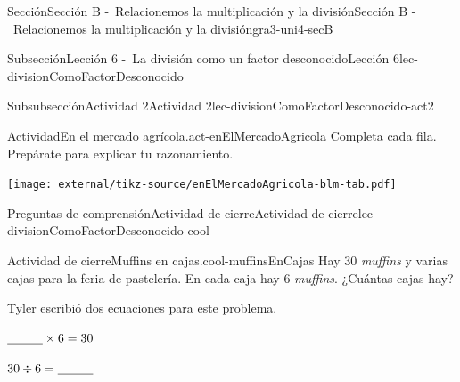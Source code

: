 \begin{sectionptx}{Sección}{Sección B -~Relacionemos la multiplicación y la división}{}{Sección B -~Relacionemos la multiplicación y la división}{}{}{gra3-uni4-secB}
%
%
\typeout{************************************************}
\typeout{************************************************}
%
\begin{subsectionptx}{Subsección}{Lección 6 -~La división como un factor desconocido}{}{Lección 6}{}{}{lec-divisionComoFactorDesconocido}
%
%
\typeout{************************************************}
\typeout{************************************************}
%
\begin{subsubsectionptx}{Subsubsección}{Actividad 2}{}{Actividad 2}{}{}{lec-divisionComoFactorDesconocido-act2}
\begin{activity}{Actividad}{En el mercado agrícola.}{act-enElMercadoAgricola}%
Completa cada fila. Prepárate para explicar tu razonamiento.%
\begin{image}{0}{1}{0}{}%
\texttt{[image: external/tikz-source/enElMercadoAgricola-blm-tab.pdf]}
\end{image}%
\end{activity}%
\end{subsubsectionptx}
%
%
\typeout{************************************************}
\typeout{************************************************}
%
\begin{reading-questions-subsubsection}{Preguntas de comprensión}{Actividad de cierre}{}{Actividad de cierre}{}{}{lec-divisionComoFactorDesconocido-cool}
\begin{project}{Actividad de cierre}{Muffins en cajas.}{cool-muffinsEnCajas}%
Hay 30 \emph{muffins} y varias cajas para la feria de pastelería. En cada caja hay 6 \emph{muffins}. ¿Cuántas cajas hay?%
\begin{sidebyside}{2}{0.05}{0.05}{0.1}%
\begin{sbspanel}{0.4}%
Tyler escribió dos ecuaciones para este problema.%
\end{sbspanel}%
\begin{sbspanel}{0.4}%
\(\underline{\hspace{1 cm}} \times 6 = 30\)%
\par
\(30 \div 6 = \underline{\hspace{1 cm}}\)%
\end{sbspanel}%
\end{sidebyside}%

\end{project}
\end{reading-questions-subsubsection}
\end{subsectionptx}
\end{sectionptx}
